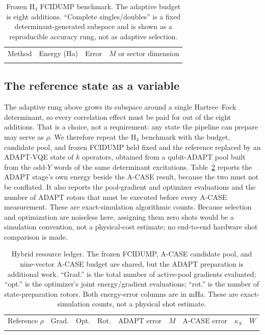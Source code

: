 \documentclass[aps,pra,reprint,superscriptaddress,nofootinbib,floatfix]{revtex4-2}
\begin{document}
\begin{table}[t]
\caption{Frozen H$_4$ FCIDUMP benchmark.  The adaptive budget is eight
additions.  ``Complete singles/doubles'' is a fixed determinant-generated
subspace and is shown as a reproducible accuracy rung, not as adaptive
selection.}
\label{tab:h4}
\begin{ruledtabular}
\begin{tabular}{lccc}
Method & Energy (Ha) & Error & $M$ or sector dimension \\
\colrule

\end{tabular}
\end{ruledtabular}
\end{table}

\subsection{The reference state as a variable}
\label{sec:warm-start}

The adaptive rung above grows its subspace around a single Hartree--Fock
determinant, so every correlation effect must be paid for out of the eight
additions.  That is a choice, not a requirement: any state the pipeline can
prepare may serve as $\rho$.  We therefore repeat the H$_4$ benchmark with the
budget, candidate pool, and frozen FCIDUMP held fixed and the reference
replaced by an ADAPT-VQE state \cite{grimsley2019adapt} of $k$ operators,
obtained from a qubit-ADAPT pool built from the odd-$Y$ words of the same
determinant excitations.  Table~\ref{tab:warm} reports the ADAPT stage's own
energy beside the A-CASE result, because the two must not be conflated.
It also reports the pool-gradient and optimizer evaluations and the number of
ADAPT rotors that must be executed before every A-CASE measurement.  These are
exact-simulation algorithmic counts.  Because selection and optimization are
noiseless here, assigning them zero shots would be a simulation convention,
not a physical-cost estimate; no end-to-end hardware shot comparison is made.

\begin{table}[t]
\caption{Hybrid resource ledger.  The frozen FCIDUMP, A-CASE candidate pool,
and nine-vector A-CASE budget are shared, but the ADAPT preparation is
additional work.  ``Grad.'' is the total number of active-pool gradients
evaluated; ``opt.'' is the optimizer's joint energy/gradient evaluations;
``rot.'' is the number of state-preparation rotors.  Both energy-error columns
are in mHa.  These are exact-simulation counts, not a physical shot estimate.}
\label{tab:warm}
\begin{ruledtabular}
\footnotesize
\begin{tabular}{lcccccccc}
Reference $\rho$ & Grad. & Opt. & Rot. & ADAPT error & $M$ & A-CASE error & $\kappa_S$ & $W$ \\
\colrule

\end{tabular}
\end{ruledtabular}
\end{table}
\end{document}
